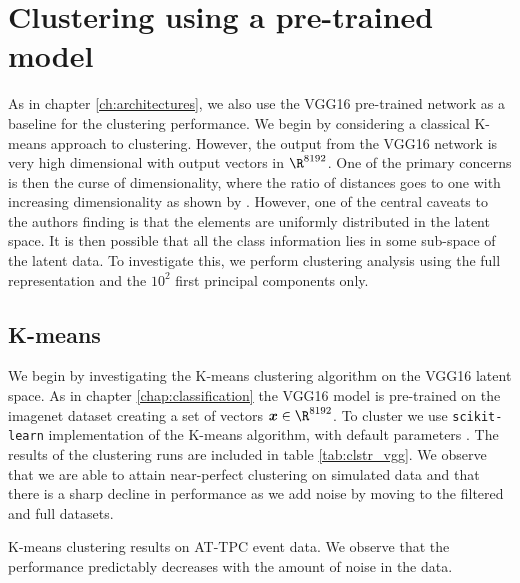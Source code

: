 
\section{Clustering using a pre-trained model}\label{sec:vgg_cluster}

As in chapter \ref{ch:architectures}, we also use the VGG16 pre-trained network as a baseline for the clustering performance. We begin by considering a classical K-means approach to clustering. However, the output from the VGG16 network is very high dimensional with output vectors in $\R^{8192}$. One of the primary concerns is then the curse of dimensionality, where the ratio of distances goes to one with increasing dimensionality as shown by \citet{Aggarwal}. However, one of the central caveats to the authors  finding is that the elements are uniformly distributed in the latent space. It is then possible that all the class information lies in some sub-space of the latent data. To investigate this, we perform clustering analysis using the full representation and the $10^2$ first principal components only. 

\subsection{K-means}

We begin by investigating the K-means clustering algorithm on the VGG16 latent space. As in chapter \ref{chap:classification} the VGG16 model is pre-trained on the imagenet dataset creating a set of vectors $\boldsymbol{x} \in \R^{8192}$. To cluster we use \lstinline{scikit-learn} implementation of the K-means algorithm, with default parameters \cite{Pedregosa2011}. The results of the clustering runs are included in table \ref{tab:clstr_vgg}. We observe that we are able to attain near-perfect clustering on simulated data and that there is a sharp decline in performance as we add noise by moving to the filtered and full datasets. 

\begin{table}[H]
\centering 
\caption[K-means on pre-trained model]{K-means clustering results on AT-TPC event data. We observe that the performance predictably decreases with the amount of noise in the data.}\label{tab:clstr_vgg}

\end{table}

